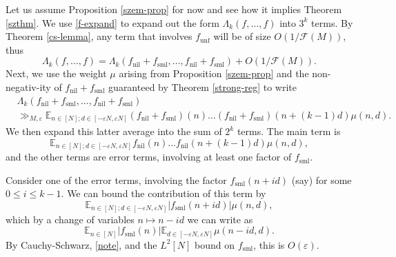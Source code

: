 \documentclass[11pt,reqno]{amsart}
\numberwithin{equation}{section}
\theoremstyle{plain}
\theoremstyle{definition}
\renewcommand{\leq}{\leqslant}
\newcommand\E{{\mathbb{E}}}
\newcommand\1{{\bf 1}}
\newcommand\2{{\bf 2}}
\newcommand\eps{\varepsilon}
\newcommand\nil{{\operatorname{nil}}}
\newcommand\sml{{\operatorname{sml}}}
\newcommand\unf{{\operatorname{unf}}}
\newcommand\Grow{{\mathcal F}}
\begin{document}
Let us assume Proposition \ref{szem-prop} for now and see how it implies Theorem \ref{szthm}.  We use \eqref{f-expand} to expand out the form $\Lambda_k(f,\ldots,f)$ into $3^k$ terms.  By Theorem \ref{cs-lemma}, any term that involves $f_\unf$ will be of size $O( 1 / \Grow(M) )$, thus
\begin{equation}\label{lack}
 \Lambda_k(f,\ldots,f) = \Lambda_k(f_\nil+f_\sml,\ldots,f_\nil+f_\sml) + O(1/\Grow(M)).
\end{equation}
Next, we use the weight $\mu$ arising from Proposition \ref{szem-prop} and the non-negativ-ity of $f_\nil+f_\sml$ guaranteed by Theorem \ref{strong-reg} to write
\begin{align*}
 & \Lambda_k  (f_\nil+f_\sml,\ldots,f_\nil+f_\sml)  \\ & \gg_{M,\eps} 
 \E_{n \in [N]; d \in [-\eps N, \eps N]} (f_\nil+f_\sml)(n) \ldots
(f_\nil+f_\sml)(n+(k-1)d) \mu(n,d).\end{align*}
We then expand this latter average into the sum of $2^k$ terms.  The main term is
\begin{equation}\label{mainterm}
 \E_{n \in [N]; d \in [-\eps N, \eps N]} f_\nil(n) \ldots
f_\nil (n+(k-1)d) \mu(n,d),
\end{equation}
and the other terms are error terms, involving at least one factor of $f_\sml$.

Consider one of the error terms, involving the factor $f_\sml(n+id)$ (say) for some $0 \leq i \leq k-1$.  We can bound the contribution of this term by
$$ \E_{n \in [N]; d \in [-\eps N, \eps N]} |f_\sml(n+id)| \mu(n,d),$$
which by a change of variables $n \mapsto n-id$ we can write as
$$ \E_{n \in [N]} |f_\sml(n)| \E_{d \in [-\eps N,\eps N]} \mu(n-id,d).$$
By Cauchy-Schwarz, \eqref{note}, and the $L^2[N]$ bound on $f_\sml$, this is $O(\eps)$.  
\end{document}
